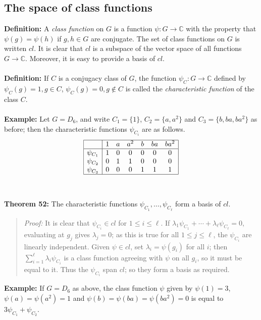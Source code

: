 {\subsection{The space of class functions}
{\bf Definition:} A \emph{class function} on $G$ is a function
$\psi:G\rightarrow{\mathbb C}$ with the property that $\psi(g)=\psi(h)$ if
$g,h\in G$ are conjugate.  The set of class functions on $G$ is written $ cl$. 
It is clear that $ cl$ is
a subspace of the vector space of all functions $G\rightarrow{\mathbb C}$. Moreover, it
is easy to provide a basis of $ cl$.
\\
\\
{\bf Definition:} If $C$ is a conjugacy class of $G$, the function
$\psi_C:G\rightarrow{\mathbb C}$ defined by
$\psi_C(g)=1, g\in C$,
$\psi_C(g)=0, g \notin C$
is called the \emph{characteristic function} of the class $C$.
\\
\\
{\bf Example:} Let $G=D_6$, and write $C_1=\{1\}$,
$C_2=\{a,a^2\}$ and $C_3=\{b,ba,ba^2\}$ as before; then the
characteristic functions $\psi_{C_i}$ are as follows.
$$
\begin{array}{|c|cccccc|}
\hline
&1&a&a^2&b&ba&ba^2\\
\hline
\psi_{C_1}&1&0&0&0&0&0\\
\psi_{C_2}&0&1&1&0&0&0\\
\psi_{C_3}&0&0&0&1&1&1\\
\hline
\end{array}
$$
\\
\\
{\bf Theorem 52:} The characteristic functions
$\psi_{C_1},\dots,\psi_{C_\ell}$ form a basis of $ cl$.
\begin{quote}
\emph{Proof:}
It is clear that $\psi_{C_i}\in cl$ for $1\leq i\leq\ell$. If
$\lambda_1\psi_{C_1}+\cdots+\lambda_\ell\psi_{C_\ell}=0$, evaluating at
$g_j$ gives $\lambda_j=0$; as this is true for all $1\leq j\leq\ell$, the
$\psi_{C_i}$ are linearly independent. Given $\psi\in cl$, set
$\lambda_i=\psi(g_i)$ for all $i$; then
$\sum_{i=1}^\ell\lambda_i\psi_{C_i}$ is a class function agreeing
with $\psi$ on all $g_i$, so it must be equal to it. Thus the
$\psi_{C_i}$ span $ cl$; so they form a basis as required.
\end{quote}
{\bf Example:} If $G=D_6$ as above, the class function
$\psi$ given by $\psi(1)=3$, $\psi(a)=\psi(a^2)=1$ and
$\psi(b)=\psi(ba)=\psi(ba^2)=0$ is equal to $3\psi_{C_1}+\psi_{C_2}$.
\\
\\
}
